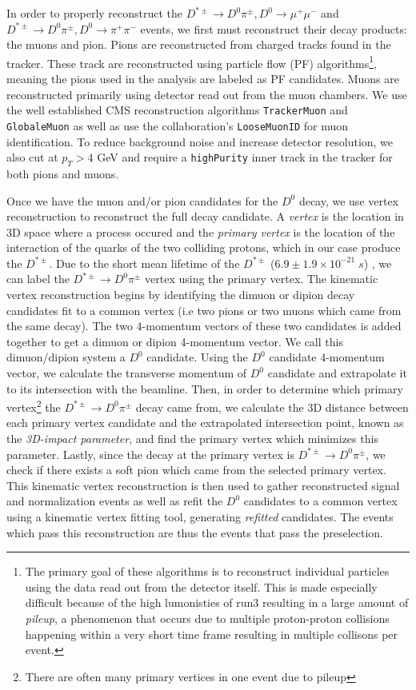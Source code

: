 In order to properly reconstruct the $D^{*\pm} \to D^0 \pi^\pm, D^0 \to \mu^+ \mu^-$ and $D^{*\pm} \to D^0 \pi^\pm, D^0 \to \pi^+ \pi^-$ events, we first must reconstruct their decay products: the muons and pion. Pions are reconstructed from charged tracks found in the tracker. These track are reconstructed using particle flow (PF) algorithms\footnote{The primary goal of these algorithms is to reconstruct individual particles using the data read out from the detector itself. This is made especially difficult because of the high lumonisties of run3 resulting in a large amount of \textit{pileup}, a phenomenon that occurs due to multiple proton-proton collisions happening within a very short time frame resulting in multiple collisons per event. }, meaning the pions used in the analysis are labeled as PF candidates. Muons are reconstructed primarily using detector read out from the muon chambers. We use the well established CMS reconstruction algorithms \texttt{TrackerMuon} and \texttt{GlobaleMuon} as well as use the collaboration's \texttt{LooseMuonID} for muon identification. To reduce background noise and increase detector resolution, we also cut at $p_T>4$ GeV and require a \texttt{highPurity} inner track in the tracker for both pions and muons.

Once we have the muon and/or pion candidates for the $D^0$ decay, we use vertex reconstruction to reconstruct the full decay candidate. A \textit{vertex} is the location in 3D space where a process occured and the \textit{primary vertex} is the location of the interaction of the quarks of the two colliding protons, which in our case produce the $D^{*\pm}$. Due to the short mean lifetime of the $D^{*\pm}$ ($ 6.9 \pm 1.9 \times 10^{-21} \; s$) \cite{ref:pdg2024}, we can label the $D^{*\pm} \to D^0 \pi^\pm$ vertex using the primary vertex. The kinematic vertex reconstruction begins by identifying the dimuon or dipion decay candidates fit to a common vertex (i.e two pions or two muons which came from the same decay). The two 4-momentum vectors of these two candidates is added together to get a dimuon or dipion 4-momentum vector. We call this dimuon/dipion system a $D^0$ candidate. Using the $D^0$ candidate 4-momentum vector, we calculate the transverse momentum of $D^0$ candidate and extrapolate it to its intersection with the beamline. Then, in order to determine which primary vertex\footnote{There are often many primary vertices in one event due to pileup} the $D^{*\pm} \to D^0 \pi^\pm$ decay came from, we calculate the 3D distance between each primary vertex candidate and the extrapolated intersection point, known as the \textit{3D-impact parameter}, and find the primary vertex which minimizes this parameter. Lastly, since the decay at the primary vertex is $D^{*\pm} \to D^0 \pi^\pm$, we check if there exists a soft pion which came from the selected primary vertex. This kinematic vertex reconstruction is then used to gather reconstructed signal and normalization events as well as refit the $D^0$ candidates to a common vertex using a kinematic vertex fitting tool, generating \textit{refitted} candidates. The events which pass this reconstruction are thus the events that pass the preselection. 


